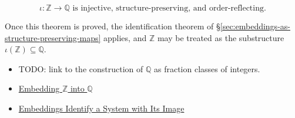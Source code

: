 \begin{remark*}
\[
\iota:\mathbb{Z}\to \mathbb{Q} \text{ is injective, structure-preserving, and order-reflecting.}
\]
\end{remark*}
\begin{remark*}[Interpretation]
Once this theorem is proved, the identification theorem of \S\ref{sec:embeddings-as-structure-preserving-maps} applies, and $\mathbb{Z}$ may be treated as the substructure $\iota(\mathbb{Z})\subseteq \mathbb{Q}$.
\end{remark*}
\begin{dependencies}
\begin{itemize}
  \item TODO: link to the construction of $\mathbb{Q}$ as fraction classes of integers.
  \item \hyperref[def:embedding-z-into-q]{Embedding $\mathbb{Z}$ into $\mathbb{Q}$}
  \item \hyperref[thm:embedding-identifies-with-image]{Embeddings Identify a System with Its Image}
\end{itemize}
\end{dependencies}
